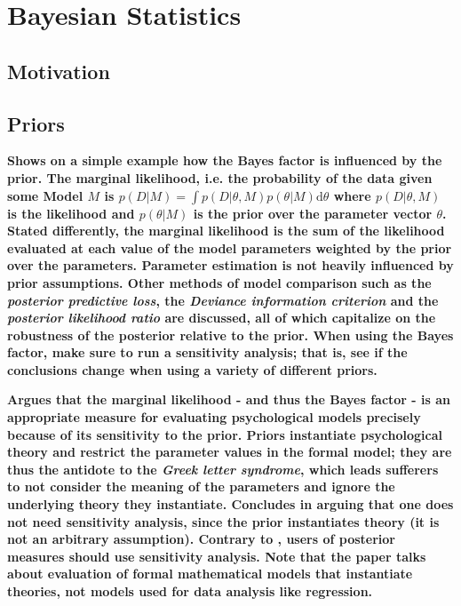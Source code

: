 \documentclass[12pt]{scrartcl}
\begin{document}
\section{Bayesian Statistics}

\subsection{Motivation}
\begin{description}
  \item {}
  
  \item {}
\end{description}


\subsection{Priors}
\begin{description}
 
  \item {}
  
  \textbf{Shows on a simple example how the Bayes factor is influenced by the prior. The marginal likelihood, i.e. the probability of the data given some Model $M$ is $p(D|M) = \int p(D|\theta, M)p(\theta| M) \mathrm{d}\theta$ where $p(D|\theta, M)$ is the likelihood and $p(\theta|M)$ is the prior over the parameter vector $\theta$. Stated differently, the marginal likelihood is the sum of the likelihood evaluated at each value of the model parameters weighted by the prior over the parameters. Parameter estimation is not heavily influenced by prior assumptions. Other methods of model comparison such as the \emph{posterior predictive loss}, the \emph{Deviance information criterion} and the \emph{posterior likelihood ratio} are discussed, all of which capitalize on the robustness of the posterior relative to the prior. When using the Bayes factor, make sure to run a sensitivity analysis; that is, see if the conclusions change when using a variety of different priors.}
  
  \item {}
  
  \textbf{Argues that the marginal likelihood - and thus the Bayes factor - is an appropriate measure for evaluating psychological models precisely because of its sensitivity to the prior. Priors instantiate psychological theory and restrict the parameter values in the formal model; they are thus the antidote to the \emph{Greek letter syndrome}, which leads sufferers to not consider the meaning of the parameters and ignore the underlying theory they instantiate. Concludes in arguing that one does not need sensitivity analysis, since the prior instantiates theory (it is not an arbitrary assumption). Contrary to \cite{liu2008bayes}, users of posterior measures should use sensitivity analysis. Note that the paper talks about evaluation of formal mathematical models that instantiate theories, not models used for data analysis like regression.}
  
  
\end{description}
\end{document}
